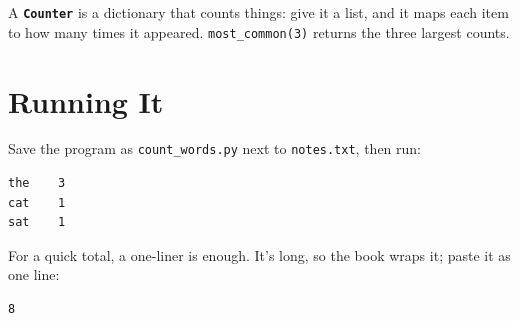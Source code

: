 A \textbf{\texttt{Counter}} is a dictionary that counts things: give it a list, and it maps each item to how many times it appeared. \texttt{most\_common(3)} returns the three largest counts.


\section{Running It}\label{02-counting-words-with-python:running-it}

Save the program as \texttt{count\_words.py} next to \texttt{notes.txt}, then run:

\begin{codeblock}

\begin{Shaded}
\begin{Highlighting}[]
\end{Highlighting}
\end{Shaded}

\end{codeblock}

\begin{codeblock}
\begin{Verbatim}[formatcom=\outputstyle]
the    3
cat    1
sat    1
\end{Verbatim}
\end{codeblock}


For a quick total, a one-liner is enough. It's long, so the book wraps it; paste it as one line:

\begin{codeblock}

\begin{Shaded}
\begin{Highlighting}[]
  
\end{Highlighting}
\end{Shaded}

\end{codeblock}

\begin{codeblock}
\begin{Verbatim}[formatcom=\outputstyle]
8
\end{Verbatim}
\end{codeblock}

